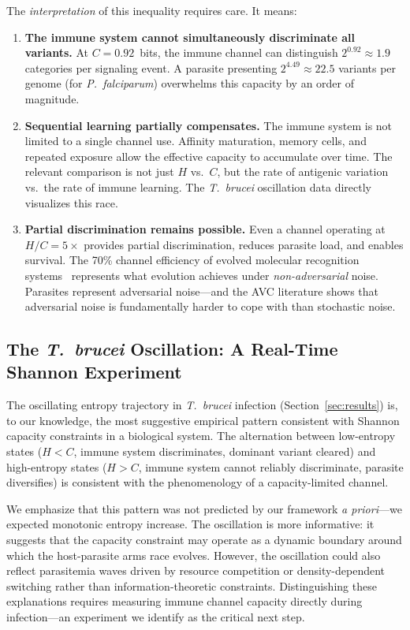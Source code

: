 \documentclass[twocolumn,10pt]{article}
\begin{document}
The \emph{interpretation} of this inequality requires care.  It means:
\begin{enumerate}
\item \textbf{The immune system cannot simultaneously discriminate all variants.}  At $C = 0.92$~bits, the immune channel can distinguish $2^{0.92} \approx 1.9$ categories per signaling event.  A parasite presenting $2^{4.49} \approx 22.5$ variants per genome (for \textit{P.~falciparum}) overwhelms this capacity by an order of magnitude.
\item \textbf{Sequential learning partially compensates.}  The immune system is not limited to a single channel use.  Affinity maturation, memory cells, and repeated exposure allow the effective capacity to accumulate over time.  The relevant comparison is not just $H$ vs.\ $C$, but the rate of antigenic variation vs.\ the rate of immune learning.  The \textit{T.~brucei} oscillation data directly visualizes this race.
\item \textbf{Partial discrimination remains possible.}  Even a channel operating at $H/C = 5\times$ provides partial discrimination, reduces parasite load, and enables survival.  The 70\% channel efficiency of evolved molecular recognition systems~\citep{schneider2000} represents what evolution achieves under \emph{non-adversarial} noise.  Parasites represent adversarial noise---and the AVC literature shows that adversarial noise is fundamentally harder to cope with than stochastic noise.
\end{enumerate}

\subsection{The \textit{T.~brucei} Oscillation: A Real-Time Shannon Experiment}

The oscillating entropy trajectory in \textit{T.~brucei} infection (Section~\ref{sec:results}) is, to our knowledge, the most suggestive empirical pattern consistent with Shannon capacity constraints in a biological system.  The alternation between low-entropy states ($H < C$, immune system discriminates, dominant variant cleared) and high-entropy states ($H > C$, immune system cannot reliably discriminate, parasite diversifies) is consistent with the phenomenology of a capacity-limited channel.

We emphasize that this pattern was not predicted by our framework \emph{a priori}---we expected monotonic entropy increase.  The oscillation is more informative: it suggests that the capacity constraint may operate as a dynamic boundary around which the host-parasite arms race evolves.  However, the oscillation could also reflect parasitemia waves driven by resource competition or density-dependent switching rather than information-theoretic constraints.  Distinguishing these explanations requires measuring immune channel capacity directly during infection---an experiment we identify as the critical next step.
\end{document}
